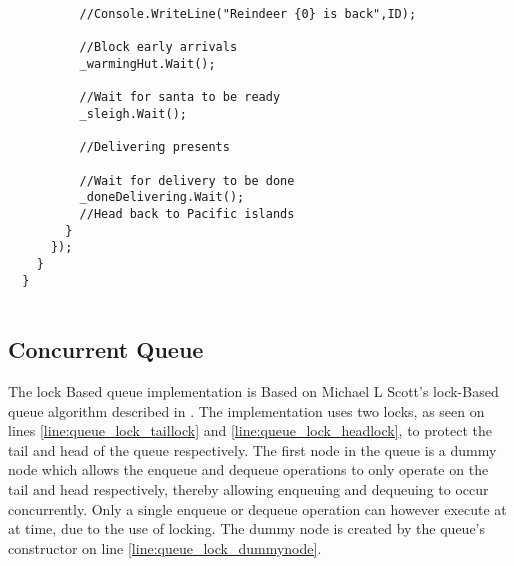 \begin{lstlisting}
          //Console.WriteLine("Reindeer {0} is back",ID);

          //Block early arrivals
          _warmingHut.Wait();

          //Wait for santa to be ready
          _sleigh.Wait();

          //Delivering presents

          //Wait for delivery to be done
          _doneDelivering.Wait();
          //Head back to Pacific islands
        }
      });
    }
  }
  
\end{lstlisting}

\subsection{Concurrent Queue}
The lock Based queue implementation is Based on Michael L Scott's lock-Based queue algorithm described in \cite{michael1996simple}. The implementation uses two locks, as seen on lines \ref{line:queue_lock_taillock} and \ref{line:queue_lock_headlock}, to protect the tail and head of the queue respectively. The first node in the queue is a dummy node which allows the enqueue and dequeue operations to only operate on the tail and head respectively, thereby allowing enqueuing and dequeuing to occur concurrently. Only a single enqueue or dequeue operation can however execute at at time, due to the use of locking. The dummy node is created by the queue's constructor on line \ref{line:queue_lock_dummynode}.


